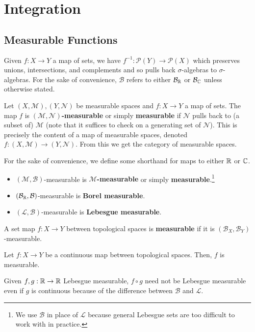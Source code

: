 \documentclass[11pt]{article}
\newcommand{\B}{\mathcal{B}}
\renewcommand{\L}{\mathcal{L}}
\newcommand{\M}{\mathcal{M}}
\renewcommand{\N}{\mathcal{N}}
\renewcommand{\P}{\mathcal{P}}
\begin{document}
\section{Integration}
\subsection{Measurable Functions}
Given $f: X\to Y$ a map of sets, we have $f^{-1}: \P(Y)\to\P(X)$ which preserves unions, intersections, and complements and so pulls back $\sigma$-algebras to $\sigma$-algebras. For the sake of convenience, $\B$ refers to either $\B_{\R}$ or $\B_{\C}$ unless otherwise stated.

\begin{definition}
Let $(X,\M),(Y,\N)$ be measurable spaces and $f: X\to Y$ a map of sets. The map $f$ is \textbf{$(\M,\N)$-measurable} or simply \textbf{measurable} if $\N$ pulls back to (a subset of) $\M$ (note that it suffices to check on a generating set of $\N$). This is precisely the content of a map of measurable spaces, denoted $f: (X,\M)\to(Y,\N)$. From this we get the category of measurable spaces.

For the sake of convenience, we define some shorthand for maps to either $\mathbb{R}$ or $\mathbb{C}$.
\begin{itemize}
\item $(\M,\B)$-measurable is \textbf{$\M$-measurable} or simply \textbf{measurable}.\footnote{We use $\B$ in place of $\L$ because general Lebesgue sets are too difficult to work with in practice.}
\item $(\B_{\R},\B)$-measurable is \textbf{Borel measurable}.
\item $(\L,\B)$-measurable is \textbf{Lebesgue measurable}.
\end{itemize}

A set map $f: X\to Y$ between topological spaces is \textbf{measurable} if it is $(\B_X,\B_Y)$-measurable.
\end{definition}

\begin{proposition}
Let $f: X\to Y$ be a continuous map between topological spaces. Then, $f$ is measurable.
\end{proposition}

\begin{remark}
Given $f,g: \mathbb{R}\to\mathbb{R}$ Lebesgue measurable, $f\circ g$ need not be Lebesgue measurable even if $g$ is continuous because of the difference between $\B$ and $\L$.
\end{remark}
\end{document}
